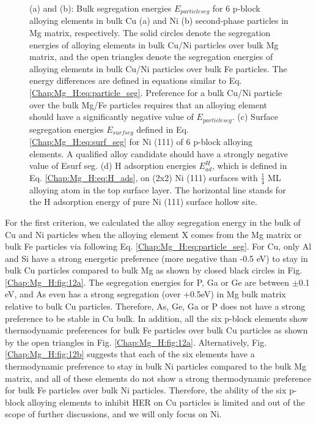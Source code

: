 \begin{figure}[!ht]
\caption[Effects of 6 p-block elements on other precipitates(Cu and Ni)]{(a) and (b): Bulk segregation energies $E_{particle seg}$ for 6 p-block alloying elements in bulk Cu (a) and Ni (b) second-phase particles in Mg matrix, respectively. The solid circles denote the segregation energies of alloying elements in bulk Cu/Ni particles over bulk Mg matrix, and the open triangles denote the segregation energies of alloying elements in bulk Cu/Ni particles over bulk Fe particles. The energy differences are defined in equations similar to Eq. \ref{Chap:Mg_H:eq:particle_seg}. Preference for a bulk Cu/Ni particle over the bulk Mg/Fe particles requires that an alloying element should have a significantly negative value of $E_{particle seg}$. (c) Surface segregation energies $E_{surf seg}$ defined in Eq. \ref{Chap:Mg_H:eq:surf_seg} for Ni (111) of 6 p-block alloying elements. A qualified alloy candidate should have a strongly negative value of Esurf seg. (d) H adsorption energies $E_{ad}^H$, which is defined in Eq. \ref{Chap:Mg_H:eq:H_ads}, on (2x2) Ni (111) surfaces with $\frac{1}{4}$ \ac{ML} alloying atom in the top surface layer. The horizontal line stands for the H adsorption energy of pure Ni (111) surface hollow site.}
  \label{Chap:Mg_H:fig12}
\end{figure}
\endgroup

For the first criterion, we calculated the alloy segregation energy in the bulk of Cu and Ni particles when the alloying element X comes from the Mg matrix or bulk Fe particles via following Eq. \ref{Chap:Mg_H:eq:particle_seg}. For Cu, only Al and Si have a strong energetic preference (more negative than -0.5 eV) to stay in bulk Cu particles compared to bulk Mg as shown by closed black circles in Fig. \ref{Chap:Mg_H:fig:12a}. The segregation energies for P, Ga or Ge are between $\pm$0.1 eV, and As even has a strong segregation (over +0.5eV) in Mg bulk matrix relative to bulk Cu particles.  Therefore, As, Ge, Ga or P does not have a strong preference to be stable in Cu bulk. In addition, all the six p-block elements show thermodynamic preferences for bulk Fe particles over bulk Cu particles as shown by the open triangles in Fig. \ref{Chap:Mg_H:fig:12a}. Alternatively, Fig. \ref{Chap:Mg_H:fig:12b} suggests that each of the six elements have a thermodynamic preference to stay in bulk Ni particles compared to the bulk Mg matrix, and all of these elements do not show a strong thermodynamic preference for bulk Fe particles over bulk Ni particles. Therefore, the ability of the six p-block alloying elements to inhibit HER on Cu particles is limited and out of the scope of further discussions, and we will only focus on Ni.

